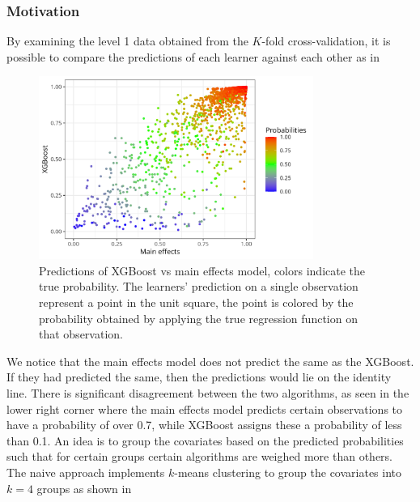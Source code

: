 \documentclass[./main.tex]{subfiles}
\begin{document}
\subsubsection{Motivation}
By examining the level 1 data obtained from the $ K $-fold cross-validation, it is possible to compare the predictions of each learner against each other as in 
\begin{figure}[H]
    \centering
    \includegraphics[width=0.8\textwidth]{figures/esl_preds_xgboost_vs_main.png}
    \caption{Predictions of XGBoost vs main effects model, colors indicate the true probability. The learners' prediction on a single observation represent a point in the unit square, the point is colored by the probability obtained by applying the true regression function on that observation.}
    \label{fig:esl_preds_xgboost_vs_main}
\end{figure}
We notice that the main effects model does not predict the same as the XGBoost. If they had predicted the same, then the predictions would lie on the identity line. There is significant disagreement between the two algorithms, as seen in the lower right corner where the main effects model predicts certain observations to have a probability of over 0.7, while XGBoost assigns these a probability of less than 0.1. An idea is to group the covariates based on the predicted probabilities such that for certain groups certain algorithms are weighed more than others. The naive approach implements $ k $-means clustering to group the covariates into $ k = 4 $ groups as shown in  
\end{document}
